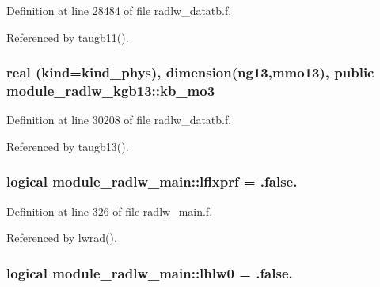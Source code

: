 Definition at line 28484 of file radlw\+\_\+datatb.\+f.



Referenced by taugb11().

\subsubsection[{\texorpdfstring{kb\+\_\+mo3}{kb_mo3}}]{\setlength{\rightskip}{0pt plus 5cm}real (kind=kind\+\_\+phys), dimension(ng13,mmo13), public module\+\_\+radlw\+\_\+kgb13\+::kb\+\_\+mo3}\hypertarget{group__module__radlw__main_gacc93fbdd9ce1062cbe9b01973d8ab229}{}\label{group__module__radlw__main_gacc93fbdd9ce1062cbe9b01973d8ab229}


Definition at line 30208 of file radlw\+\_\+datatb.\+f.



Referenced by taugb13().

\subsubsection[{\texorpdfstring{lflxprf}{lflxprf}}]{\setlength{\rightskip}{0pt plus 5cm}logical module\+\_\+radlw\+\_\+main\+::lflxprf = .false.\hspace{0.3cm}{\ttfamily [private]}}\hypertarget{group__module__radlw__main_gaec461dc1a50b326daa15c57c7dc55602}{}\label{group__module__radlw__main_gaec461dc1a50b326daa15c57c7dc55602}


Definition at line 326 of file radlw\+\_\+main.\+f.



Referenced by lwrad().

\subsubsection[{\texorpdfstring{lhlw0}{lhlw0}}]{\setlength{\rightskip}{0pt plus 5cm}logical module\+\_\+radlw\+\_\+main\+::lhlw0 = .false.\hspace{0.3cm}{\ttfamily [private]}}\hypertarget{group__module__radlw__main_ga7f8818436b81efe586d83b2f03b1617f}{}\label{group__module__radlw__main_ga7f8818436b81efe586d83b2f03b1617f}


